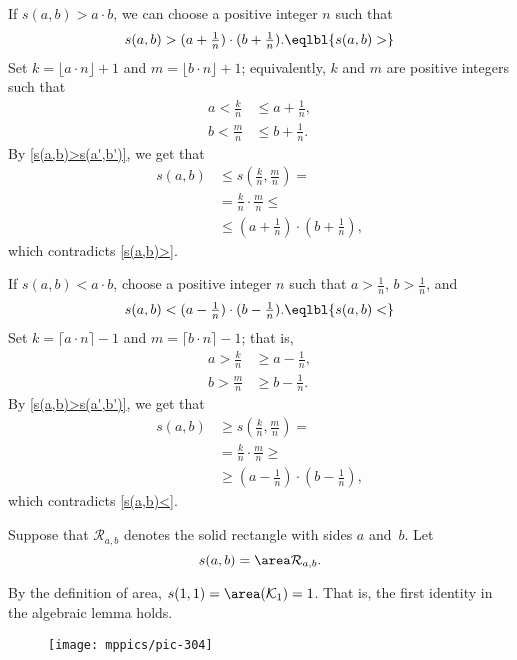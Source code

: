 \raggedcolumns\setlength{\multicolsep}{.5mm}
\setlength{\columnseprule}{1pt}
\begin{multicols}{2}
If $s(a,b)> a\cdot b$,
we can choose a positive integer $n$ such that
\[s(a,b)> (a+\tfrac1n)\cdot (b+\tfrac1n).\eqlbl{s(a,b)>}\]
Set $k=\lfloor a\cdot n \rfloor+1$ and $m=\lfloor b\cdot n \rfloor+1$;
equivalently, $k$ and $m$ are positive integers such that
\begin{align*}
a< \tfrac kn&\le a+\tfrac1n,
\\
b<\tfrac mn&\le b+\tfrac1n.
\end{align*}
By \ref{s(a,b)>s(a',b')}, we get that
\begin{align*}
s(a,b)&\le s(\tfrac kn,\tfrac mn)=
\\
&=\tfrac kn\cdot\tfrac mn\le
\\
&\le (a+\tfrac1n)\cdot(b+\tfrac1n),
\end{align*}
which contradicts \ref{s(a,b)>}.

\columnbreak

If $s(a,b)< a\cdot b$, choose a positive integer $n$ such that $a>\tfrac1n$, $b>\tfrac1n$, and
\[s(a,b)< (a-\tfrac1n)\cdot (b-\tfrac1n).\eqlbl{s(a,b)<}\]
Set $k=\lceil a\cdot n \rceil-1$ and $m=\lceil b\cdot n \rceil-1$; that is,
\begin{align*}
a> \tfrac kn&\ge a-\tfrac1n,
\\
b>\tfrac mn&\ge b-\tfrac1n.
\end{align*}
By \ref{s(a,b)>s(a',b')}, we get that
\begin{align*}
s(a,b)&\ge s(\tfrac kn,\tfrac mn)=
\\
&=\tfrac kn\cdot\tfrac mn\ge
\\
&\ge (a-\tfrac1n)\cdot(b-\tfrac1n),
\end{align*}
which contradicts \ref{s(a,b)<}.\qeds
\end{multicols}
\setlength{\columnseprule}{0pt}








Suppose that $\mathcal{R}_{a,b}$ denotes the solid rectangle with sides $a$ and~$b$.
Let
\[s(a,b)=\area \mathcal{R}_{a,b}.\]

By the definition of area,
$s(1,1)=\area(\mathcal{K}_1)=1$.
That is, the first identity in the algebraic lemma holds.


\begin{wrapfigure}{o}{30 mm}
\vskip-0mm
\centering
\texttt{[image: mppics/pic-304]}
\end{wrapfigure}

